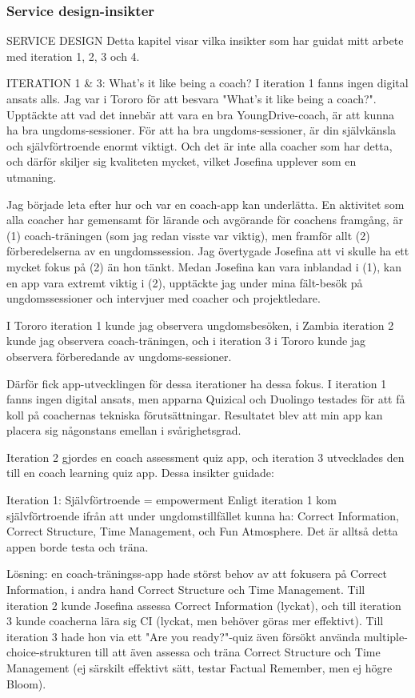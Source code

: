 \subsubsection{Service design-insikter}

SERVICE DESIGN
Detta kapitel visar vilka insikter som har guidat mitt arbete med iteration 1, 2, 3 och 4.

ITERATION 1 \& 3: What's it like being a coach?
I iteration 1 fanns ingen digital ansats alls. Jag var i Tororo för att besvara "What's it like being a coach?". Upptäckte att vad det innebär att vara en bra YoungDrive-coach, är att kunna ha bra ungdoms-sessioner. För att ha bra ungdoms-sessioner, är din självkänsla och självförtroende enormt viktigt. Och det är inte alla coacher som har detta, och därför skiljer sig kvaliteten mycket, vilket Josefina upplever som en utmaning.

Jag började leta efter hur och var en coach-app kan underlätta. En aktivitet som alla coacher har gemensamt för lärande och avgörande för coachens framgång, är (1) coach-träningen (som jag redan visste var viktig), men framför allt (2) förberedelserna av en ungdomssession. Jag övertygade Josefina att vi skulle ha ett mycket fokus på (2) än hon tänkt. Medan Josefina kan vara inblandad i (1), kan en app vara extremt viktig i (2), upptäckte jag under mina fält-besök på ungdomssessioner och intervjuer med coacher och projektledare.

I Tororo iteration 1 kunde jag observera ungdomsbesöken, i Zambia iteration 2 kunde jag observera coach-träningen, och i iteration 3 i Tororo kunde jag observera förberedande av ungdoms-sessioner.

Därför fick app-utvecklingen för dessa iterationer ha dessa fokus. I iteration 1 fanns ingen digital ansats, men apparna Quizical och Duolingo testades för att få koll på coachernas tekniska förutsättningar. Resultatet blev att min app kan placera sig någonstans emellan i svårighetsgrad.

Iteration 2 gjordes en coach assessment quiz app, och iteration 3 utvecklades den till en coach learning quiz app. Dessa insikter guidade:

Iteration 1: Självförtroende = empowerment
Enligt iteration 1 kom självförtroende ifrån att under ungdomstillfället kunna ha: Correct Information, Correct Structure, Time Management, och Fun Atmosphere. Det är alltså detta appen borde testa och träna.

Lösning: en coach-träningss-app hade störst behov av att fokusera på Correct Information, i andra hand Correct Structure och Time Management. Till iteration 2 kunde Josefina assessa Correct Information (lyckat), och till iteration 3 kunde coacherna lära sig CI (lyckat, men behöver göras mer effektivt). Till iteration 3 hade hon via ett "Are you ready?"-quiz även försökt använda multiple-choice-strukturen till att även assessa och träna Correct Structure och Time Management (ej särskilt effektivt sätt, testar Factual Remember, men ej högre Bloom).

